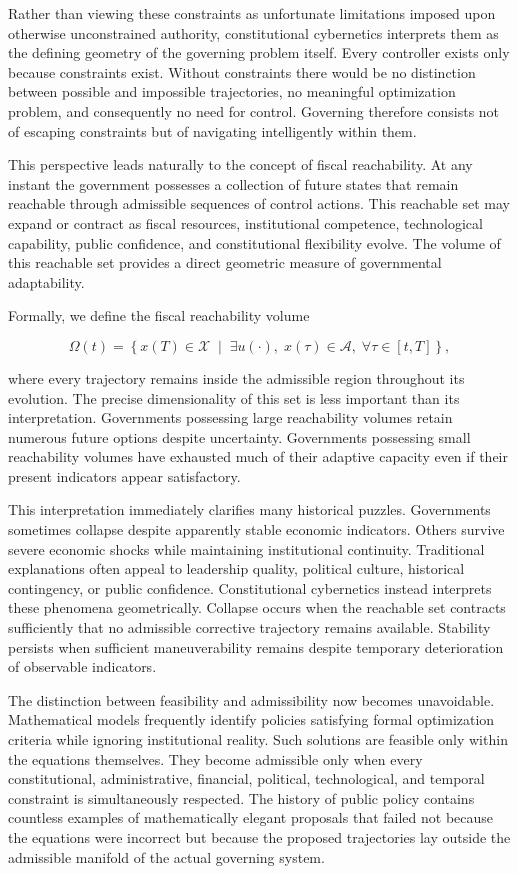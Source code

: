 \documentclass[12pt,a4paper]{article}
\begin{document}
Rather than viewing these constraints as unfortunate limitations imposed upon otherwise unconstrained authority, constitutional cybernetics interprets them as the defining geometry of the governing problem itself. Every controller exists only because constraints exist. Without constraints there would be no distinction between possible and impossible trajectories, no meaningful optimization problem, and consequently no need for control. Governing therefore consists not of escaping constraints but of navigating intelligently within them.

This perspective leads naturally to the concept of fiscal reachability. At any instant the government possesses a collection of future states that remain reachable through admissible sequences of control actions. This reachable set may expand or contract as fiscal resources, institutional competence, technological capability, public confidence, and constitutional flexibility evolve. The volume of this reachable set provides a direct geometric measure of governmental adaptability.

Formally, we define the fiscal reachability volume

\[
\Omega(t)
=
\left\{
x(T)
\in
\mathcal{X}
\;
\middle|
\;
\exists
u(\cdot),
\;
x(\tau)
\in
\mathcal{A},
\;
\forall
\tau
\in
[t,T]
\right\},
\]

where every trajectory remains inside the admissible region throughout its evolution. The precise dimensionality of this set is less important than its interpretation. Governments possessing large reachability volumes retain numerous future options despite uncertainty. Governments possessing small reachability volumes have exhausted much of their adaptive capacity even if their present indicators appear satisfactory.

This interpretation immediately clarifies many historical puzzles. Governments sometimes collapse despite apparently stable economic indicators. Others survive severe economic shocks while maintaining institutional continuity. Traditional explanations often appeal to leadership quality, political culture, historical contingency, or public confidence. Constitutional cybernetics instead interprets these phenomena geometrically. Collapse occurs when the reachable set contracts sufficiently that no admissible corrective trajectory remains available. Stability persists when sufficient maneuverability remains despite temporary deterioration of observable indicators.

The distinction between feasibility and admissibility now becomes unavoidable. Mathematical models frequently identify policies satisfying formal optimization criteria while ignoring institutional reality. Such solutions are feasible only within the equations themselves. They become admissible only when every constitutional, administrative, financial, political, technological, and temporal constraint is simultaneously respected. The history of public policy contains countless examples of mathematically elegant proposals that failed not because the equations were incorrect but because the proposed trajectories lay outside the admissible manifold of the actual governing system.
\end{document}
